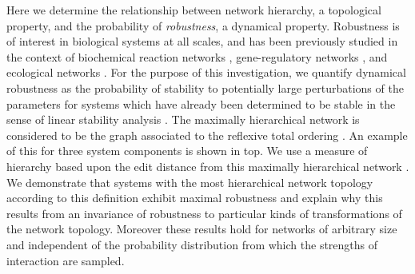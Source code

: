 Here we determine the relationship between network hierarchy, a topological property, and the probability of \emph{robustness}, a dynamical property. Robustness is of interest in biological systems at all scales, and has been previously studied in the context of biochemical reaction networks \cite{Shinar2010}, gene-regulatory networks \cite{VanNimwegen1999,Siegal2002,Wagner2013}, and ecological networks \cite{Rohr2014}. For the purpose of this investigation, we quantify dynamical robustness as the probability of stability to potentially large perturbations of the parameters for systems which have already been determined to be stable in the sense of linear stability analysis \cite{Davis1962}. The maximally hierarchical network is considered to be the graph associated to the reflexive total ordering \cite{Cormen2009}. An example of this for three system components is shown in  top. We use a measure of hierarchy based upon the edit distance from this maximally hierarchical network \cite{Axenovich2011}. We demonstrate that systems with the most hierarchical network topology according to this definition exhibit maximal robustness and explain why this results from an invariance of robustness to particular kinds of transformations of the network topology. Moreover these results hold for networks of arbitrary size and independent of the probability distribution from which the strengths of interaction are sampled.
